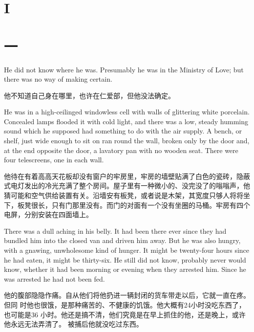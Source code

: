 \begin{paracol}{2}
\switchcolumn*

\section{I}

\switchcolumn

\section*{一}\label{ux5341ux4e5d}

\switchcolumn*

He did not know where he was. Presumably he was in the Ministry of Love;
but there was no way of making certain.

\switchcolumn

他不知道自己身在哪里，也许在仁爱部，但他没法确定。

\switchcolumn*

He was in a high-ceilinged windowless cell with walls of glittering
white porcelain. Concealed lamps flooded it with cold light, and there
was a low, steady humming sound which he supposed had something to do
with the air supply. A bench, or shelf, just wide enough to sit on ran
round the wall, broken only by the door and, at the end opposite the
door, a lavatory pan with no wooden seat. There were four telescreens,
one in each wall.

\switchcolumn

他待在有着高高天花板却没有窗户的牢房里，牢房的墙壁贴满了白色的瓷砖，隐蔽式电灯发出的冷光充满了整个房间。屋子里有一种微小的、没完没了的嗡嗡声，他猜可能和空气供给装置有关。沿墙安有板凳，或者说是木架，其宽度只够人将将坐下，板凳很长，只有门那里没有。而门的对面有一个没有坐圈的马桶。牢房有四个电屏，分别安装在四面墙上。

\switchcolumn*

There was a dull aching in his belly. It had been there ever since they
had bundled him into the closed van and driven him away. But he was also
hungry, with a gnawing, unwholesome kind of hunger. It might be
twenty-four hours since he had eaten, it might be thirty-six. He still
did not know, probably never would know, whether it had been morning or
evening when they arrested him. Since he was arrested he had not been
fed.

\switchcolumn

他的腹部隐隐作痛。自从他们将他扔进一辆封闭的货车带走以后，它就一直在疼。但同
时他也很饿，是那种痛苦的、不健康的饥饿。他大概有24小时没吃东西了，也可能是36
小时。他还是搞不清，他们究竟是在早上抓住的他，还是晚上，或许他永远无法弄清了。
被捕后他就没吃过东西。


\end{paracol}
